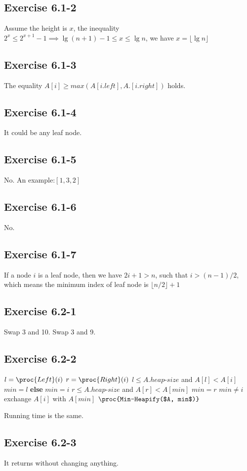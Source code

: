 \documentclass[12pt]{article}
\theoremstyle{definition}
\theoremstyle{remark}
\begin{document}
\subsection*{Exercise 6.1-2}
Assume the height is $x$, the inequality $2^x\le 2^{x+1}-1\implies \lg(n+1)-1\le x\le \lg n$, we have $x=\lfloor \lg n\rfloor$
\subsection*{Exercise 6.1-3}
The equality $A[i]\ge max(A[i.left],A.[i.right])$ holds.
\subsection*{Exercise 6.1-4}
It could be any leaf node.
\subsection*{Exercise 6.1-5}
No. An example:$[1,3,2]$
\subsection*{Exercise 6.1-6}
No.
\subsection*{Exercise 6.1-7}
If a node $i$ is a leaf node, then we have $2i+1>n$, such that $i>(n-1)/2$, which means the minimum index of leaf node is $\lfloor n/2\rfloor+1$
\subsection*{Exercise 6.2-1}
Swap 3 and 10. Swap 3 and 9.
\subsection*{Exercise 6.2-2}
\begin{codebox}
\li $l=\proc{Left}(i)$
\li $r=\proc{Right}(i)$
\li \If $l\le A.heap\text{-}size$ and $A[l]<A[i]$
\li \quad $min=l$
\li \textbf{else} $min=i$
\li \If $r\le A.heap\text{-}size$ and $A[r]<A[min]$
\li \quad $min=r$
\li \If $min\ne i$
\li \quad exchange $A[i]$ with $A[min]$
\li \quad $\proc{Min-Heapify($A, min$)}$
\end{codebox}
Running time is the same.
\subsection*{Exercise 6.2-3}
It returns without changing anything.
\end{document}
